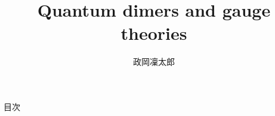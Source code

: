 \documentclass[8pt,unicode,xcolor=svgnames]{beamer}
\numberwithin{equation}{section}
\begin{document}
\title{Quantum dimers and gauge theories}
\author{政岡凜太郎}
\frame{\titlepage}
\begin{frame}{目次}\tableofcontents\end{frame}




\end{document}
